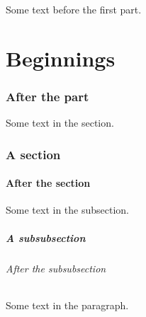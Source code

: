 \documentclass{article}
\begin{document}
Some text before the first part.
\part{Beginnings}
\section{After the part}
Some text in the section.
\section{A section}
\subsection{After the section}
Some text in the subsection.
\subsubsection{A subsubsection}
\paragraph{After the subsubsection}
Some text in the paragraph.
\end{document}
